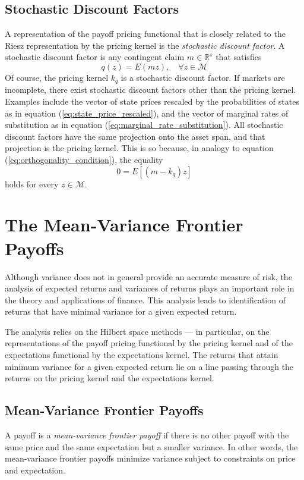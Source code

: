 \documentclass[\topdir/lecture\_notes.tex]{subfiles}
\begin{document}
\subsection{Stochastic Discount Factors}
A representation of the payoff pricing functional that is closely related to the Riesz representation by the pricing kernel is the \emph{stochastic discount factor}. A stochastic discount factor is any contingent claim \(m \in \mathbb{R}^{s}\) that satisfies
\begin{equation}
q(z)=E(m z), \quad \forall z \in \mathcal{M} \label{eq:stochastic_discount_factor} 
\end{equation}
Of course, the pricing kernel \(k_{q}\) is a stochastic discount factor. If markets are incomplete, there exist stochastic discount factors other than the pricing kernel. Examples include the vector of state prices rescaled by the probabilities of states as in equation (\ref{eq:state_price_rescaled}), and the vector of marginal rates of substitution as in equation (\ref{eq:marginal_rate_substitution}). All stochastic discount factors have the same projection onto the asset span, and that projection is the pricing kernel. This is so because, in analogy to equation (\ref{eq:orthogonality_condition}), the equality
\begin{equation*}
0=E[(m-k_{q}) z] 
\end{equation*}
holds for every \(z \in \mathcal{M}\).

\section{The Mean-Variance Frontier Payoffs}
Although variance does not in general provide an accurate measure of risk, the analysis of expected returns and variances of returns plays an important role in the theory and applications of finance. This analysis leads to identification of returns that have minimal variance for a given expected return.

The analysis relies on the Hilbert space methods --- in particular, on the representations of the payoff pricing functional by the pricing kernel and of the expectations functional by the expectations kernel. The returns that attain minimum variance for a given expected return lie on a line passing through the returns on the pricing kernel and the expectations kernel.

\subsection{Mean-Variance Frontier Payoffs}
A payoff is a \emph{mean-variance frontier payoff} if there is no other payoff with the same price and the same expectation but a smaller variance. In other words, the mean-variance frontier payoffs minimize variance subject to constraints on price and expectation.
\end{document}
